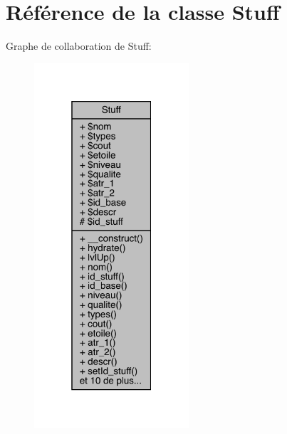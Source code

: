 \hypertarget{class_stuff}{}\section{Référence de la classe Stuff}
\label{class_stuff}


Graphe de collaboration de Stuff\+:\nopagebreak
\begin{figure}[H]
\begin{center}
\leavevmode
\includegraphics[width=163pt]{class_stuff__coll__graph}
\end{center}
\end{figure}
